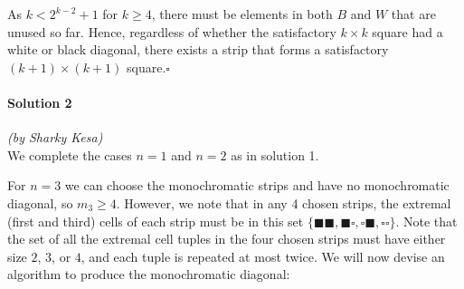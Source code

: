 \documentclass[10pt]{article}
\newcommand{\ws}{\square}
\newcommand{\bs}{\blacksquare}
\begin{document}
	As \(k < 2^{k-2} + 1\) for \(k \geq 4\), there must be elements in both \(B\) and \(W\) that are unused so far. Hence, regardless of whether the satisfactory \(k \times k\) square had a white or black diagonal, there exists a strip that forms a satisfactory \((k+1) \times (k+1)\) square.\hfill\ensuremath{\square}\\
	
		\noindent \makebox[\linewidth]{\rule{\textwidth}{0.4pt}}
	
	\paragraph{Solution 2} \textit{(by Sharky Kesa)}\\
	
	\noindent We complete the cases \(n = 1\) and \(n = 2\) as in solution 1.
	
	For \(n = 3\) we can choose the monochromatic strips and have no monochromatic diagonal, so $m_3 \geq 4$. However, we note that in any 4 chosen strips, the extremal (first and third) cells of each strip must be in this set $\{\bs \bs, \bs \ws, \ws \bs, \ws \ws\}$. Note that the set of all the extremal cell tuples in the four chosen strips must have either size $2$, $3$, or $4$, and each tuple is repeated at most twice. We will now devise an algorithm to produce the monochromatic diagonal:
	
\end{document}
